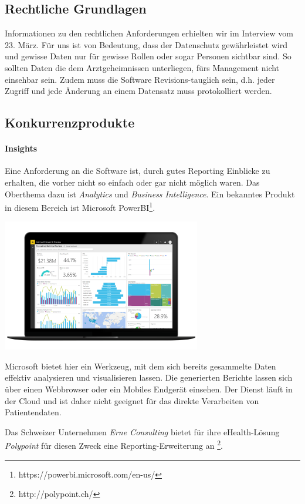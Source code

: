 \documentclass[a4paper]{scrreprt}
\begin{document}
\subsection{Rechtliche Grundlagen}
Informationen zu den rechtlichen Anforderungen erhielten wir im Interview vom 23. März. Für uns ist von Bedeutung, dass der Datenschutz gewährleistet wird und gewisse Daten nur für gewisse Rollen oder sogar Personen sichtbar sind. So sollten Daten die dem Arztgeheimnissen unterliegen, fürs Management nicht einsehbar sein.
Zudem muss die Software Revisions-tauglich sein, d.h. jeder Zugriff und jede Änderung an einem Datensatz muss protokolliert werden.



\subsection{Konkurrenzprodukte}
\paragraph{Insights} Eine Anforderung an die Software ist, durch gutes Reporting Einblicke zu erhalten, die vorher nicht so einfach oder gar nicht möglich waren. Das Oberthema dazu ist \textit{Analytics} und \textit{Business Intelligence}. Ein bekanntes Produkt in diesem Bereich ist Microsoft PowerBI\footnote{https://powerbi.microsoft.com/en-us/}.

\includegraphics[width=0.65\textwidth]{img/research_ms-powerbi.png}

Microsoft bietet hier ein Werkzeug, mit dem sich bereits gesammelte Daten effektiv analysieren und visualisieren lassen. Die generierten Berichte lassen sich über einen Webbrowser oder ein Mobiles Endgerät einsehen. Der Dienst läuft in der Cloud und ist daher nicht geeignet für das direkte Verarbeiten von Patientendaten.

\pagebreak

Das Schweizer Unternehmen \textit{Erne Consulting} bietet für ihre eHealth-Lösung \textit{Polypoint} für diesen Zweck eine Reporting-Erweiterung an \footnote{http://polypoint.ch/}.
\end{document}

